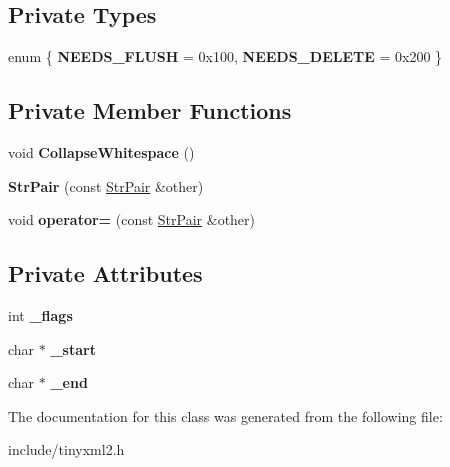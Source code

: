 \subsection*{Private Types}
\begin{DoxyCompactItemize}
\item 
\mbox{\label{classtinyxml2_1_1StrPair_a476a92d76f24486c3ae4731916b12aae}} 
enum \{ {\bfseries N\+E\+E\+D\+S\+\_\+\+F\+L\+U\+SH} = 0x100, 
{\bfseries N\+E\+E\+D\+S\+\_\+\+D\+E\+L\+E\+TE} = 0x200
 \}
\end{DoxyCompactItemize}
\subsection*{Private Member Functions}
\begin{DoxyCompactItemize}
\item 
\mbox{\label{classtinyxml2_1_1StrPair_ade1469025e6b4cac74397a82a7429337}} 
void {\bfseries Collapse\+Whitespace} ()
\item 
\mbox{\label{classtinyxml2_1_1StrPair_ac43c1f4a5730c5582f9cff724376d106}} 
{\bfseries Str\+Pair} (const \mbox{\hyperlink{classtinyxml2_1_1StrPair}{Str\+Pair}} \&other)
\item 
\mbox{\label{classtinyxml2_1_1StrPair_abeca3b715def403efed9f725d0fb0060}} 
void {\bfseries operator=} (const \mbox{\hyperlink{classtinyxml2_1_1StrPair}{Str\+Pair}} \&other)
\end{DoxyCompactItemize}
\subsection*{Private Attributes}
\begin{DoxyCompactItemize}
\item 
\mbox{\label{classtinyxml2_1_1StrPair_ae6fabc08e7b24b0d41fa5f2fadbda4ed}} 
int {\bfseries \+\_\+flags}
\item 
\mbox{\label{classtinyxml2_1_1StrPair_acfd8687916a02833cc55c279460d2f4a}} 
char $\ast$ {\bfseries \+\_\+start}
\item 
\mbox{\label{classtinyxml2_1_1StrPair_a855c81f785458d8f84313221f2d4a1eb}} 
char $\ast$ {\bfseries \+\_\+end}
\end{DoxyCompactItemize}


The documentation for this class was generated from the following file\+:\begin{DoxyCompactItemize}
\item 
include/tinyxml2.\+h\end{DoxyCompactItemize}
